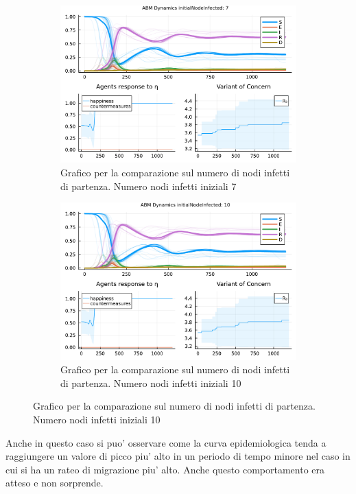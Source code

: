 \begin{figure}[!hb]
\begin{subfigure}[b]{0.45\textwidth}
		\includegraphics[width=\textwidth]{img/SocialNetworkABM_3_II.pdf}
		\caption{Grafico per la comparazione sul numero di nodi infetti di partenza. Numero nodi infetti iniziali 7}
		\label{fig:comparison_init_node_inf_7}
	\end{subfigure}
	\hfill
	\begin{subfigure}[b]{0.45\textwidth}
		\centering
		\includegraphics[width=\textwidth]{img/SocialNetworkABM_4_II.pdf}
		\caption{Grafico per la comparazione sul numero di nodi infetti di partenza. Numero nodi infetti iniziali 10}
		\label{fig:comparison_init_node_inf_10}
	\end{subfigure}
\end{figure}

Anche in questo caso si puo' osservare come la curva epidemiologica tenda a raggiungere un valore 
di picco piu' alto in un periodo di tempo minore nel caso in cui si ha un rateo di migrazione piu' alto. 
Anche questo comportamento era atteso e non sorprende.

